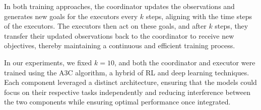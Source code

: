 \documentclass[preprint,12pt]{elsarticle}
\begin{document}
In both training approaches, the coordinator updates the observations and generates new goals for the executors every $k$ steps, aligning with the time steps of the executors. The executors then act on these goals, and after $k$ steps, they transfer their updated observations back to the coordinator to receive new objectives, thereby maintaining a continuous and efficient training process.

In our experiments, we fixed $k = 10$, and both the coordinator and executor were trained using the A3C algorithm, a hybrid of RL and deep learning techniques. Each component leveraged a distinct architecture, ensuring that the models could focus on their respective tasks independently and reducing interference between the two components while ensuring optimal performance once integrated.



\end{document}
